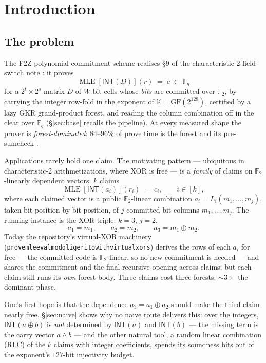 \documentclass[11pt]{article}
\newcommand{\F}{\mathbb{F}}
\newcommand{\K}{\mathbb{K}}            %
\newcommand{\Ftwo}{\F_2}
\newcommand{\Fq}{\F_q}                 %
\newcommand{\INT}{\mathsf{INT}}
\DeclareRobustCommand{\code}[1]{{\def\_{\textunderscore\allowbreak}\texttt{#1}}}
\DeclareMathOperator{\MLE}{MLE}
\theoremstyle{plain}
\theoremstyle{definition}
\theoremstyle{remark}
\begin{document}
\tableofcontents

\section{Introduction}\label{sec:intro}

\subsection{The problem}

The F2Z polynomial commitment scheme \cite{F2Zdesign,F2Zreadme} realises \S9 of
the characteristic-2 field-switch note \cite{Xnote,Sou}: it proves
\[
  \MLE[\INT(D)](r) \;=\; c \;\in\; \Fq
\]
for a $2^{t}\times 2^{s}$ matrix $D$ of $W$-bit cells whose \emph{bits} are
committed over $\Ftwo$, by carrying the integer row-fold in the exponent of
$\K=\mathrm{GF}(2^{128})$, certified by a lazy GKR grand-product forest, and
reading the column combination off in the clear over $\Fq$
(\S\ref{sec:base} recalls the pipeline). At every measured shape the prover is
\emph{forest-dominated}: $84$--$96\%$ of prove time is the forest and its
pre-sumcheck \cite{F2Zreadme}.

Applications rarely hold one claim. The motivating pattern --- ubiquitous in
characteristic-2 arithmetizations, where XOR is free --- is a \emph{family} of
claims on $\Ftwo$-linearly dependent vectors: $k$ claims
\[
  \MLE[\INT(a_i)](r_i) \;=\; c_i, \qquad i\in[k],
\]
where each claimed vector is a public $\Ftwo$-linear combination
$a_i = L_i(m_1,\dots,m_j)$, taken bit-position by bit-position, of $j$
committed bit-columns $m_1,\dots,m_j$. The running instance is the XOR triple:
$k=3$, $j=2$,
\[
  a_1 = m_1, \qquad a_2 = m_2, \qquad a_3 = m_1\oplus m_2 .
\]
Today the repository's virtual-XOR machinery
(\code{prove\_mle\_eval\_mod\_q\_ligerito\_with\_virtual\_xors}) derives the rows of
each $a_i$ for free --- the committed code is $\Ftwo$-linear, so no new
commitment is needed --- and shares the commitment and the final recursive
opening across claims; but each claim still runs its \emph{own} forest body.
Three claims cost three forests: ${\sim}3\times$ the dominant phase.

One's first hope is that the dependence $a_3=a_1\oplus a_2$ should make the
third claim nearly free. \S\ref{sec:naive} shows why no naive route delivers
this: over the integers, $\INT(a\oplus b)$ is \emph{not} determined by
$\INT(a)$ and $\INT(b)$ --- the missing term is the carry vector $a\wedge b$
--- and the other natural tool, a random linear combination (RLC) of the $k$
claims with integer coefficients, spends its soundness bits out of the
exponent's $127$-bit injectivity budget.
\end{document}
